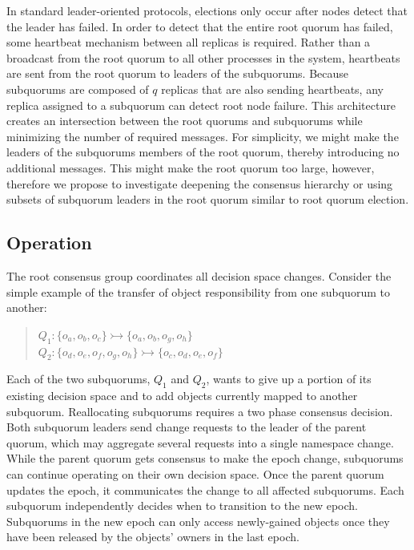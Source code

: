 \documentclass[sigconf]{acmart}
\begin{document}
In standard leader-oriented protocols, elections only occur after nodes detect that the
leader has failed.
In order to detect that the entire root quorum has failed, some heartbeat mechanism
between all replicas is required.
Rather than a broadcast from the root quorum to all other processes in the system,
heartbeats are sent from the root quorum to leaders of the subquorums.
Because subquorums are composed of $q$ replicas that are also sending heartbeats, any
replica assigned to a subquorum can detect root node failure.
This architecture creates an intersection between the root quorums and subquorums while
minimizing the number of required messages.
For simplicity, we might make the leaders of the subquorums members of the root quorum,
thereby introducing no additional messages.
This might make the root quorum too large, however, therefore we propose to investigate
deepening the consensus hierarchy or using subsets of subquorum leaders in the root
quorum similar to root quorum election.

\subsection{Operation}

The root consensus group coordinates all decision space changes.
Consider the simple example of the transfer of object responsibility from one subquorum
to another:

\begin{quote}
\small
   $Q_1: \{o_a,o_b,o_c\} \rightarrowtail \{o_a,o_b,o_g,o_h\}$\\
   $Q_2: \{o_d,o_e,o_f,o_g,o_h\} \rightarrowtail \{o_c,o_d,o_e,o_f\}$
\end{quote}

Each of the two subquorums, $Q_1$ and $Q_2$, wants to give up a portion of its
existing decision space and to add objects currently mapped to another subquorum.
Reallocating subquorums requires a two phase consensus decision.
Both subquorum leaders send change requests to the leader of the parent quorum, which may
aggregate several requests into a single namespace change.
While the parent quorum gets consensus to make the epoch change, subquorums can continue
operating on their own decision space.
Once the parent quorum updates the epoch, it communicates the change to all affected
subquorums.
Each subquorum independently decides when to transition to the new epoch.
Subquorums in the new epoch can only access newly-gained objects once they have been
released by the objects' owners in the last epoch.
\end{document}
